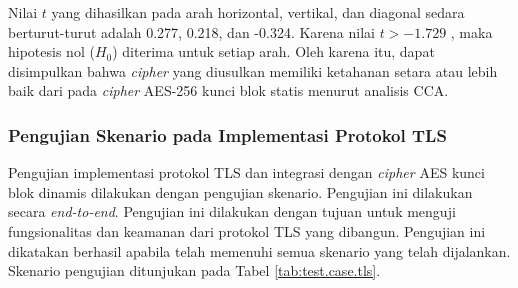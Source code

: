 Nilai $t$ yang dihasilkan pada arah horizontal, vertikal, dan diagonal sedara berturut-turut adalah 0.277, 0.218, dan -0.324. Karena nilai $t > -1.729$ , maka hipotesis nol ($H_0$) diterima untuk setiap arah. Oleh karena itu, dapat disimpulkan bahwa \emph{cipher} yang diusulkan memiliki ketahanan setara atau lebih baik dari pada \emph{cipher} AES-256 kunci blok statis menurut analisis CCA.

\subsubsection{Pengujian Skenario pada Implementasi Protokol TLS}

Pengujian implementasi protokol TLS dan integrasi dengan \emph{cipher} AES kunci blok dinamis dilakukan dengan pengujian skenario. Pengujian ini dilakukan secara \emph{end-to-end}. Pengujian ini dilakukan dengan tujuan untuk menguji fungsionalitas dan keamanan dari protokol TLS yang dibangun. Pengujian ini dikatakan berhasil apabila telah memenuhi semua skenario yang telah dijalankan. Skenario pengujian ditunjukan pada Tabel \ref{tab:test.case.tls}.


